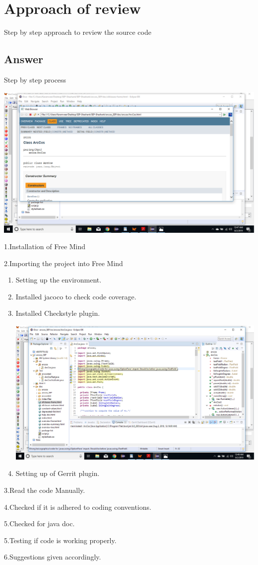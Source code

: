 \documentclass[
	12pt, %
]{fphw}
\begin{document}

\section*{Approach of review}

\begin{problem}
	Step by step approach to review the source code
	
\end{problem}


\subsection*{Answer}
Step by step process
\begin{center} \includegraphics[width=0.5\columnwidth]{ShashankJavaDoc.png} %
\end{center}
\item 1.Installation of Free Mind
\item 2.Importing the project into Free Mind
	\begin{enumerate} %
		\item Setting up the environment.
		\item Installed jacoco to check code coverage.
		\item Installed Checkstyle plugin.
		\begin{center} \includegraphics[width=0.5\columnwidth]{ShashankCheckstyle.png} %
\end{center}
        \item Setting up of Gerrit plugin.
	\end{enumerate}
\item 3.Read the code Manually.
\item 4.Checked if it is adhered to coding conventions.
\item 5.Checked for java doc.
\item 5.Testing if code is working properly.
\item 6.Suggestions given accordingly.
\end{document}
